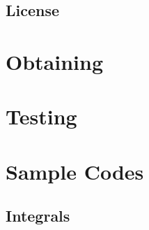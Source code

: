 \documentclass[12pt]{article}
\begin{document}
    \subsection{License} \label{license}
    
\section{Obtaining \PSIfour} \label{svn}
    
\section{Testing} \label{testing}
    
\section{Sample Codes} \label{sample-codes}
    
    \subsection{Integrals} \label{integrals}
    

\newpage
\appendix
\end{document}
